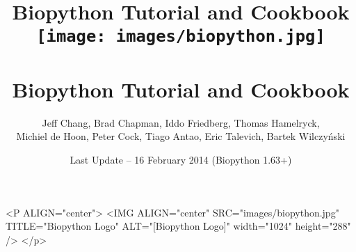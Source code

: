 \documentclass{report}
\begin{document}
\begin{htmlonly}
\title{Biopython Tutorial and Cookbook}
\end{htmlonly}
\begin{latexonly}
\title{
\texttt{[image: images/biopython.jpg]}\\
~\\
Biopython Tutorial and Cookbook}
\end{latexonly}

\author{Jeff Chang, Brad Chapman, Iddo Friedberg, Thomas Hamelryck, \\
Michiel de Hoon, Peter Cock, Tiago Antao, Eric Talevich, Bartek Wilczy\'{n}ski}
\date{Last Update -- 16 February 2014 (Biopython 1.63+)}

\begin{rawhtml}
<P ALIGN="center">
<IMG ALIGN="center" SRC="images/biopython.jpg" TITLE="Biopython Logo" ALT="[Biopython Logo]" width="1024" height="288" />
</p>
\end{rawhtml}

\maketitle
\tableofcontents




















\end{document}
